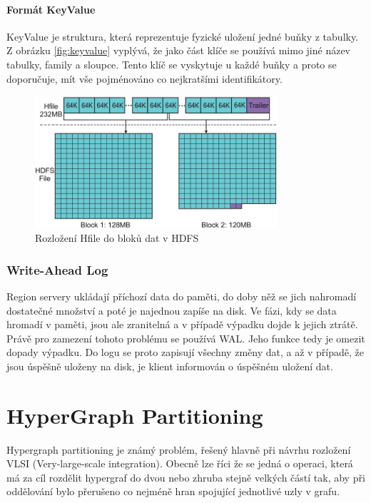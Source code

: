 \documentclass[thesis=M,czech]{FITthesis}[2012/06/26]
\begin{document}
\paragraph{Formát KeyValue}
KeyValue je struktura, která reprezentuje fyzické uložení jedné buňky z tabulky. Z obrázku \ref{fig:keyvalue} vyplývá, že jako část klíče se používá mimo jiné  název tabulky, family a sloupce. Tento klíč se vyskytuje u každé buňky a proto se doporučuje, mít vše pojménováno co nejkratšími identifikátory.	
\begin{figure}[h]\centering
	\includegraphics[width=0.8\textwidth, angle=0]{files/HFileToHDFS}
	\caption[Rozložení Hfile do bloků dat v HDFS]{Rozložení Hfile do bloků dat v HDFS}\label{fig:hfiletohdfs}
\end{figure}


\subsubsection{Write-Ahead Log}
Region servery ukládají příchozí data do paměti, do doby něž se jich nahromadí dostatečné množství a poté je najednou zapíše na disk. Ve fázi, kdy se data hromadí v paměti, jsou ale zranitelná a v případě výpadku dojde k jejich ztrátě. Právě pro zamezení tohoto problému se používá WAL. Jeho funkce tedy je omezit dopady výpadku. Do logu se proto zapisují všechny změny dat, a až v případě, že jsou úspěšně uloženy na disk, je klient informován o úspěšném uložení dat. 

\section{HyperGraph Partitioning}
Hypergraph partitioning je známý problém, řešený hlavně při návrhu rozložení VLSI (Very-large-scale integration). Obecně lze říci že se jedná o operaci, která má za cíl rozdělit hypergraf do dvou nebo zhruba stejně velkých částí tak, aby při oddělování bylo přerušeno co nejméně hran spojující jednotlivé uzly v grafu.
\end{document}
